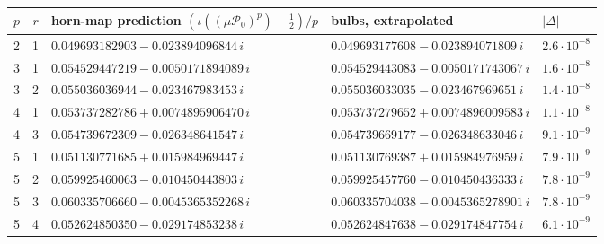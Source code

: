 \begin{tabular}{@{}cclll@{}}
\toprule
$p$ & $r$ & horn-map prediction $(\iota((\mu\mathcal P_0)^p)-\frac12)/p$ & bulbs, extrapolated & $|\Delta|$ \\
\midrule
2 & 1 & $0.049693182903 - 0.023894096844\,i$ & $0.049693177608 - 0.023894071809\,i$ & $2.6\cdot10^{-8}$ \\
3 & 1 & $0.054529447219 - 0.0050171894089\,i$ & $0.054529443083 - 0.0050171743067\,i$ & $1.6\cdot10^{-8}$ \\
3 & 2 & $0.055036036944 - 0.023467983453\,i$ & $0.055036033035 - 0.023467969651\,i$ & $1.4\cdot10^{-8}$ \\
4 & 1 & $0.053737282786 + 0.0074895906470\,i$ & $0.053737279652 + 0.0074896009583\,i$ & $1.1\cdot10^{-8}$ \\
4 & 3 & $0.054739672309 - 0.026348641547\,i$ & $0.054739669177 - 0.026348633046\,i$ & $9.1\cdot10^{-9}$ \\
5 & 1 & $0.051130771685 + 0.015984969447\,i$ & $0.051130769387 + 0.015984976959\,i$ & $7.9\cdot10^{-9}$ \\
5 & 2 & $0.059925460063 - 0.010450443803\,i$ & $0.059925457760 - 0.010450436333\,i$ & $7.8\cdot10^{-9}$ \\
5 & 3 & $0.060335706660 - 0.0045365352268\,i$ & $0.060335704038 - 0.0045365278901\,i$ & $7.8\cdot10^{-9}$ \\
5 & 4 & $0.052624850350 - 0.029174853238\,i$ & $0.052624847638 - 0.029174847754\,i$ & $6.1\cdot10^{-9}$ \\
\bottomrule
\end{tabular}
